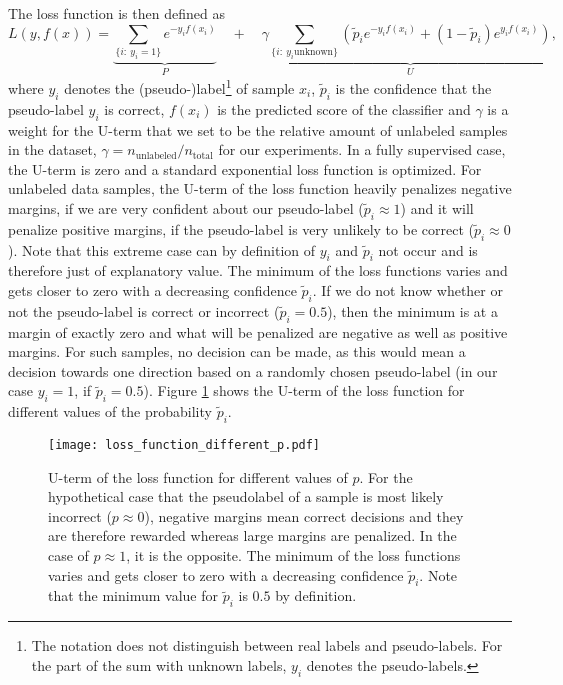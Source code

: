 The loss function is then defined as
\begin{equation*}
L(y,f(x)) = \underbrace{\sum_{\{i :~ y_i = 1\}} e^{-y_i f(x_i)}}_{P} \quad + \quad \gamma\underbrace{\sum_{\{i:~ y_i \text{unknown}\}} \left( \tilde p_i e^{-y_i f(x_i)} + (1-\tilde p_i) e^{y_i f(x_i)}\right)}_{U}, 
\end{equation*}
where $y_i$ denotes the (pseudo-)label\footnote{The notation does not distinguish between real labels and pseudo-labels. For the part of the sum with unknown labels, $y_i$ denotes the pseudo-labels.} of sample $x_i$, $\tilde p_i$ is the confidence that the pseudo-label $y_i$ is correct, $f(x_i)$ is the predicted score of the classifier and $\gamma$ is a weight for the U-term that we set to be the relative amount of unlabeled samples in the dataset, $\gamma = n_{\text{unlabeled}}/n_{\text{total}}$ for our experiments. 
In a fully supervised case, the U-term is zero and a standard exponential loss function is optimized. 
For unlabeled data samples, the U-term of the loss function heavily penalizes negative margins, if we are very confident about our pseudo-label ($\tilde p_i \approx 1$) and it will penalize positive margins, if the pseudo-label is very unlikely to be correct ($\tilde p_i \approx 0$). 
Note that this extreme case can by definition of $y_i$ and $\tilde p_i$ not occur and is therefore just of explanatory value. 
The minimum of the loss functions varies and gets closer to zero with a decreasing confidence $\tilde p_i$. If we do not know whether or not the pseudo-label is correct or incorrect ($\tilde p_i = 0.5$), then the minimum is at a margin of exactly zero and what will be penalized are negative as well as positive margins. For such samples, no decision can be made, as this would mean a decision towards one direction based on a randomly chosen pseudo-label (in our case $y_i = 1$, if $\tilde p_i=0.5$). Figure \ref{fig:ourlossfunctionplot} shows the U-term of the loss function for different values of the probability $\tilde p_i$.

\begin{figure}[ht]
  \centering
  \texttt{[image: loss\_function\_different\_p.pdf]}	
  \caption{U-term of the loss function for different values of $p$. For the hypothetical case that the pseudolabel of a sample is most likely incorrect ($p \approx 0$), negative margins mean correct decisions and they are therefore rewarded whereas large margins are penalized. In the case of $p \approx 1$, it is the opposite. The minimum of the loss functions varies and gets closer to zero with a decreasing confidence $\tilde p_i$. Note that the minimum value for $\tilde p_i$ is $0.5$ by definition.}
  \label{fig:ourlossfunctionplot}
\end{figure}

